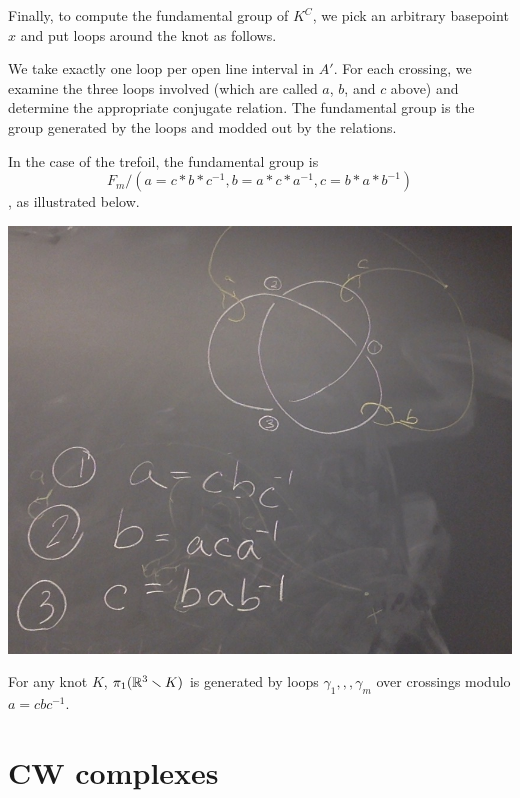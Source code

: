 \documentclass[11pt,leqno,oneside]{amsart}
\numberwithin{thm}{section}
\newcommand{\minus}{\smallsetminus}
\newcommand{\fund}{\pi_1}
\begin{document}
\begin{example}
  Finally, to compute the fundamental group of $K^C$, we pick an arbitrary basepoint $x$ and put loops around the knot as follows.

  We take exactly one loop per open line interval in $A'$.  For each crossing, we examine the three loops involved (which are called $a$, $b$, and $c$ above) and determine the appropriate conjugate relation.  The fundamental group is the group generated by the loops and modded out by the relations.

  In the case of the trefoil, the fundamental group is $${F_m}/{(a=c*b*c^{-1}, b=a*c*a^{-1}, c=b*a*b^{-1})}$$, as illustrated below.

  \includegraphics[scale=0.2]{images/trefoil-fully-described.jpg}
\end{example}
\begin{thm}[Wirtinger]
  For any knot $K$, $\fund(\R^3\minus K)$ is generated by loops $\gamma_1,,,\gamma_m$ over crossings modulo $a = cbc^{-1}$.
\end{thm}


\section{CW complexes}
\end{document}
